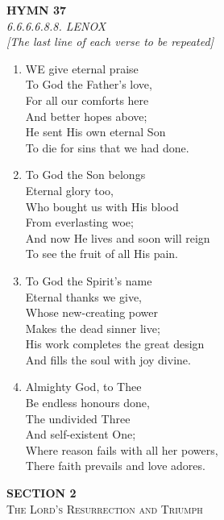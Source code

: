 \documentclass[11pt,a4paper]{article}
\begin{document}
\newpage
\begin{center}
    {\Large \textbf{HYMN 37}}
    \\
    \textit{6.6.6.6.8.8. LENOX}
    \\
    \textit{\small [The last line of each verse to be repeated]}
\end{center}
\vspace{1em}

\begin{enumerate}
    \item WE give eternal praise \\
        To God the Father's love, \\
        For all our comforts here \\
        And better hopes above; \\
        He sent His own eternal Son \\
        To die for sins that we had done.

    \item To God the Son belongs \\
        Eternal glory too, \\
        Who bought us with His blood \\
        From everlasting woe; \\
        And now He lives and soon will reign \\
        To see the fruit of all His pain.

    \item To God the Spirit's name \\
        Eternal thanks we give, \\
        Whose new-creating power \\
        Makes the dead sinner live; \\
        His work completes the great design \\
        And fills the soul with joy divine.

    \item Almighty God, to Thee \\
        Be endless honours done, \\
        The undivided Three \\
        And self-existent One; \\
        Where reason fails with all her powers, \\
        There faith prevails and love adores.

\end{enumerate}
\newpage
\thispagestyle{empty}
\vspace*{3.5cm}
\begin{center}
    {\LARGE \textbf{SECTION 2}}\\[0.8em]
    {\Large \textsc{The Lord's Resurrection and Triumph}}
\end{center}
\vspace{3.5cm}
\end{document}
